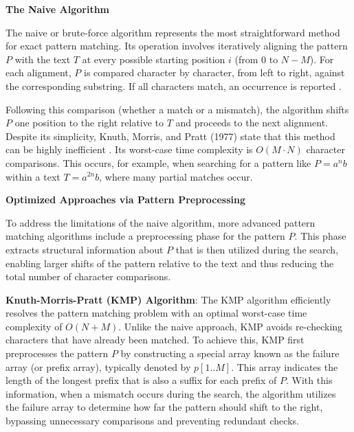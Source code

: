 
\textbf{The Naive Algorithm}

The naive or brute-force algorithm represents the most straightforward method for exact pattern matching. Its operation involves iteratively aligning the pattern $P$ with the text $T$ at every possible starting position $i$ (from 0 to $N-M$). For each alignment, $P$ is compared character by character, from left to right, against the corresponding substring. If all characters match, an occurrence is reported \cite{Gusfield1997}.

Following this comparison (whether a match or a mismatch), the algorithm shifts $P$ one position to the right relative to $T$ and proceeds to the next alignment. Despite its simplicity, Knuth, Morris, and Pratt (1977) state that this method can be highly inefficient \cite{KnuthMorrisPratt1977}. Its worst-case time complexity is $O(M \cdot N)$ character comparisons. This occurs, for example, when searching for a pattern like $P = a^n b$ within a text $T = a^{2n} b$, where many partial matches occur.

\textbf{Optimized Approaches via Pattern Preprocessing}

To address the limitations of the naive algorithm, more advanced pattern matching algorithms include a preprocessing phase for the pattern $P$. This phase extracts structural information about $P$ that is then utilized during the search, enabling larger shifts of the pattern relative to the text and thus reducing the total number of character comparisons.

\textbf{Knuth-Morris-Pratt (KMP) Algorithm}: The KMP algorithm \cite{KnuthMorrisPratt1977} efficiently resolves the pattern matching problem with an optimal worst-case time complexity of $O(N + M)$. Unlike the naive approach, KMP avoids re-checking characters that have already been matched. To achieve this, KMP first preprocesses the pattern $P$ by constructing a special array known as the failure array (or prefix array), typically denoted by $p[1..M]$. This array indicates the length of the longest prefix that is also a suffix for each prefix of $P$. With this information, when a mismatch occurs during the search, the algorithm utilizes the failure array to determine how far the pattern should shift to the right, bypassing unnecessary comparisons and preventing redundant checks.

